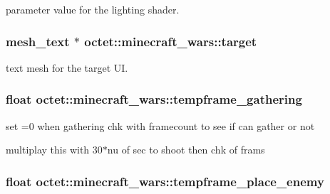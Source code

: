parameter value for the lighting shader. 

\hypertarget{classoctet_1_1minecraft__wars_a42fe53052b940a1b7f758e56156bbc3c}{
\subsubsection[{target}]{\setlength{\rightskip}{0pt plus 5cm}mesh\+\_\+text $\ast$ octet\+::minecraft\+\_\+wars\+::target\hspace{0.3cm}{\ttfamily [private]}}}\label{classoctet_1_1minecraft__wars_a42fe53052b940a1b7f758e56156bbc3c}


text mesh for the target U\+I. 

\hypertarget{classoctet_1_1minecraft__wars_a16ff1afbb738dec45fe41a8c90caf3d9}{
\subsubsection[{tempframe\+\_\+gathering}]{\setlength{\rightskip}{0pt plus 5cm}float octet\+::minecraft\+\_\+wars\+::tempframe\+\_\+gathering\hspace{0.3cm}{\ttfamily [private]}}}\label{classoctet_1_1minecraft__wars_a16ff1afbb738dec45fe41a8c90caf3d9}


set =0 when gathering chk with framecount to see if can gather or not 

multiplay this with 30$\ast$nu of sec to shoot then chk of frams \hypertarget{classoctet_1_1minecraft__wars_aad3088aab37dfa4958679db1811faa5a}{
\subsubsection[{tempframe\+\_\+place\+\_\+enemy}]{\setlength{\rightskip}{0pt plus 5cm}float octet\+::minecraft\+\_\+wars\+::tempframe\+\_\+place\+\_\+enemy\hspace{0.3cm}{\ttfamily [private]}}}\label{classoctet_1_1minecraft__wars_aad3088aab37dfa4958679db1811faa5a}


